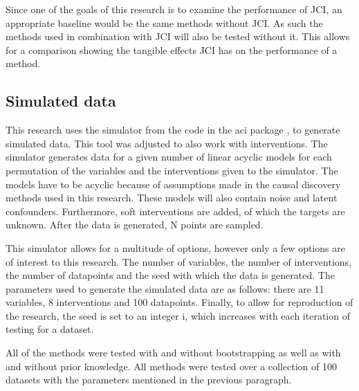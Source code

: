 \documentclass[a4paper,pdf]{article}
\begin{document}
Since one of the goals of this research is to examine the performance of JCI, an appropriate baseline would be the same methods without JCI. As such the methods used in combination with JCI will also be tested without it. This allows for a comparison showing the tangible effects JCI has on the performance of a method.

\subsection{Simulated data}
This research uses the simulator from the code in the aci package \cite{jci}, to generate simulated data. This tool was adjusted to also work with interventions. The simulator generates data for a given number of linear acyclic models for each permutation of the variables and the interventions given to the simulator. The models have to be acyclic because of assumptions made in the causal discovery methods used in this research. These models will also contain noise and latent confounders. Furthermore, soft interventions are added, of which the targets are unknown. After the data is generated, N points are sampled.

This simulator allows for a multitude of options, however only a few options are of interest to this research. The number of variables, the number of interventions, the number of datapoints and the seed with which the data is generated. The parameters used to generate the simulated data are as follows: there are 11 variables, 8 interventions and 100 datapoints. Finally, to allow for reproduction of the research, the seed is set to an integer i, which increases with each iteration of testing for a dataset.


All of the methods were tested with and without bootstrapping as well as with and without prior knowledge. All methods were tested over a collection of 100 datasets with the parameters mentioned in the previous paragraph.
\end{document}
